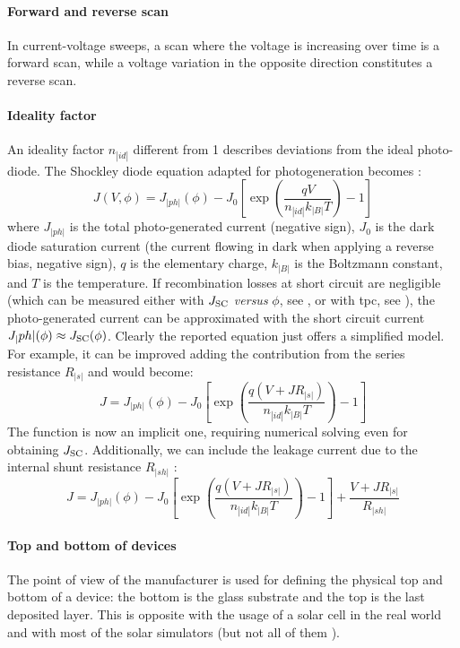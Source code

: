 		\paragraph{Forward and reverse scan}\label{characterization_fwdrev}
		In current-voltage sweeps, a scan where the voltage is increasing over time is a forward scan, while a voltage variation in the opposite direction constitutes a reverse scan.

		\paragraph{Ideality factor}
		An ideality factor $n_|id|$ different from 1 describes deviations from the ideal photo-diode.
		The Shockley diode equation adapted for photogeneration becomes \cite{Calado2019}:
		\begin{equation} \label{eq:photodiode}
			J(V,\phi) = J_|ph|(\phi) - J_0\left[\exp(\frac{qV}{n_|id|k_|B|T})-1\right]
		\end{equation}
		where $J_|ph|$ is the total photo\hyp{}generated current (negative sign), $J_0$ is the dark diode saturation current (the current flowing in dark when applying a reverse bias, negative sign), $q$ is the elementary charge, $k_|B|$ is the Boltzmann constant, and $T$ is the temperature.
		If recombination losses at short circuit are negligible (which can be measured either with $J_\mathrm{SC}$ \textsl{versus} $\phi$, see , or with \gls{tpc}, see ), the photo\hyp{}generated current can be approximated with the short circuit current $J_|ph|(\phi) \approx J_\mathrm{SC}(\phi)$.
		Clearly the reported equation just offers a simplified model.
		For example, it can be improved adding the contribution from the series resistance $R_|s|$ and would become:
		\begin{equation}\label{eq:series_resistance}
			J = J_|ph|(\phi) - J_0\left[\exp(\frac{q(V+JR_|s|)}{n_|id|k_|B|T})-1\right]
		\end{equation}
		The function is now an implicit one, requiring numerical solving even for obtaining $J_\mathrm{SC}$.
		Additionally, we can include the leakage current due to the internal shunt resistance $R_|sh|$ \cite{Nelson2003}:
		\begin{equation}
			J = J_|ph|(\phi) - J_0\left[\exp(\frac{q(V+JR_|s|)}{n_|id|k_|B|T})-1\right] + \frac{V+JR_|s|}{R_|sh|}
		\end{equation}

		\paragraph{Top and bottom of devices}
		The point of view of the manufacturer is used for defining the physical top and bottom of a device: the bottom is the glass substrate and the top is the last deposited layer.
		This is opposite with the usage of a solar cell in the real world and with most of the solar simulators (but not all of them
		\cite{Fluxim}).

